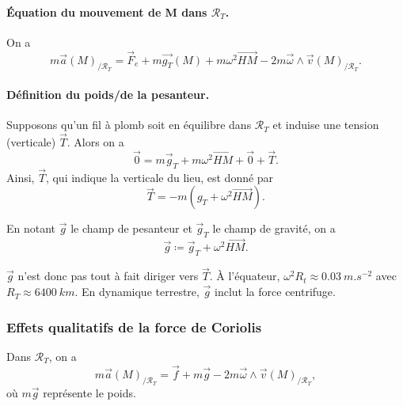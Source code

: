             \paragraph{Équation du mouvement de M dans $\mathcal{R}_T$.}
            On a 
            \begin{equation*}
                m\vec{a}(M)_{/\mathcal{R}_T}=\vec{F}_e+m\vec{g_T}(M)+m\omega^{2}\vec{HM}-2m\vec{\omega}\wedge\vec{v}(M)_{/\mathcal{R}_T}.
            \end{equation*}

            \paragraph{Définition du poids/de la pesanteur.}
            Supposons qu'un fil à plomb soit en équilibre dans $\mathcal{R}_T$ et induise une tension (verticale) $\vec{T}$. Alors on a 
            \begin{equation*}
                \vec{0}=m\vec{g}_T+m\omega^{2}\vec{HM}+\vec{0}+\vec{T}.
            \end{equation*}
            Ainsi, $\vec{T}$, qui indique la verticale du lieu, est donné par
            \begin{equation*}
                \vec{T}=-m\left(g_T+\omega^{2}\vec{HM}\right).
            \end{equation*}

            \begin{definition}
                    En notant $\vec{g}$ le champ de pesanteur et $\vec{g}_{T}$ le champ de gravité, on a
                    \begin{equation*}
                        \boxed{
                        \vec{g}\coloneqq \vec{g}_T+\omega^{2}\vec{HM}.}
                    \end{equation*}
            \end{definition}

            $\vec{g}$ n'est donc pas tout à fait diriger vers $\vec{T}$. À l'équateur, $\omega^{2}R_t\approx0.03~m.s^{-2}$ avec $R_T\approx 6400~km$. En dynamique terrestre, $\vec{g}$ inclut la force centrifuge.

        \subsubsection{Effets qualitatifs de la force de Coriolis}

            Dans $\mathcal{R}_T$, on a 
            \begin{equation*}
                m\vec{a}(M)_{/\mathcal{R}_T}=\vec{f}+m\vec{g}-2m\vec{\omega}\wedge\vec{v}(M)_{/\mathcal{R}_T},
            \end{equation*}
            où $m\vec{g}$ représente le poids.

